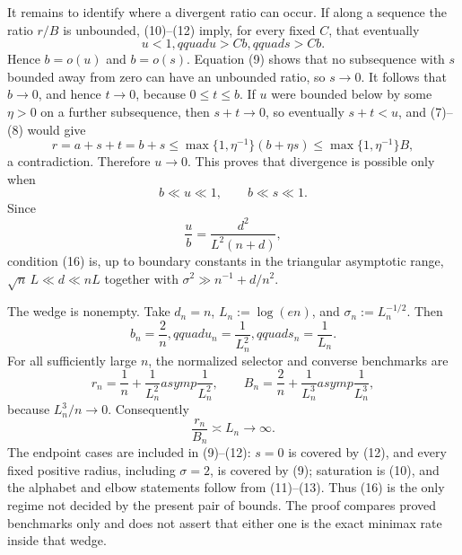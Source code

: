 It remains to identify where a divergent ratio can occur.  If along a sequence the ratio \(r/B\) is unbounded, (10)--(12) imply, for every fixed \(C\), that eventually
\[
 u<1,qquad u>Cb,qquad s>Cb.
\tag{14}
\]
Hence \(b=o(u)\) and \(b=o(s)\).  Equation (9) shows that no subsequence with \(s\) bounded away from zero can have an unbounded ratio, so \(s\to0\).  It follows that \(b\to0\), and hence \(t\to0\), because \(0\le t\le b\).  If \(u\) were bounded below by some \(\eta>0\) on a further subsequence, then \(s+t\to0\), so eventually \(s+t<u\), and (7)--(8) would give
\[
 r=a+s+t=b+s
 \le\max\{1,\eta^{-1}\}(b+\eta s)
 \le\max\{1,\eta^{-1}\}B,
\tag{15}
\]
a contradiction.  Therefore \(u\to0\).  This proves that divergence is possible only when
\[
 b\ll u\ll1,
 \qquad b\ll s\ll1.
\tag{16}
\]
Since
\[
 \frac ub=\frac{d^2}{L^2(n+d)},
\tag{17}
\]
condition (16) is, up to boundary constants in the triangular asymptotic range, \(\sqrt n\,L\ll d\ll nL\) together with \(\sigma^2\gg n^{-1}+d/n^2\).

The wedge is nonempty.  Take \(d_n=n\), \(L_n:=\log(en)\), and \(\sigma_n:=L_n^{-1/2}\).  Then
\[
 b_n=\frac2n,qquad u_n=\frac1{L_n^2},qquad s_n=\frac1{L_n}.
\tag{18}
\]
For all sufficiently large \(n\), the normalized selector and converse benchmarks are
\[
 r_n=\frac1n+\frac1{L_n^2}asymp\frac1{L_n^2},
 \qquad
 B_n=\frac2n+\frac1{L_n^3}asymp\frac1{L_n^3},
\tag{19}
\]
because \(L_n^3/n\to0\).  Consequently
\[
 \frac{r_n}{B_n}\asymp L_n\longrightarrow\infty.
\tag{20}
\]
The endpoint cases are included in (9)--(12): \(s=0\) is covered by (12), and every fixed positive radius, including \(\sigma=2\), is covered by (9); saturation is (10), and the alphabet and elbow statements follow from (11)--(13).  Thus (16) is the only regime not decided by the present pair of bounds.  The proof compares proved benchmarks only and does not assert that either one is the exact minimax rate inside that wedge.